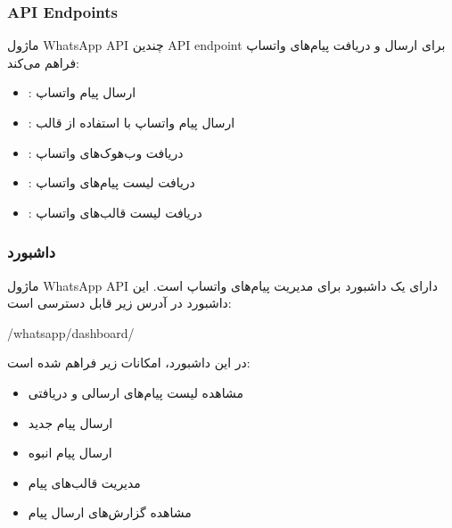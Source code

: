 \documentclass[letterpaper,10pt,english]{sphinxmanual}
\begin{document}
\subsubsection{API Endpoints}
\label{\detokenize{modules/whatsapp_api:api-endpoints}}
\sphinxAtStartPar
ماژول WhatsApp API چندین API endpoint برای ارسال و دریافت پیام‌های واتساپ فراهم می‌کند:
\begin{itemize}
\item {} 
\sphinxAtStartPar
{}: ارسال پیام واتساپ

\item {} 
\sphinxAtStartPar
{}: ارسال پیام واتساپ با استفاده از قالب

\item {} 
\sphinxAtStartPar
{}: دریافت وب‌هوک‌های واتساپ

\item {} 
\sphinxAtStartPar
{}: دریافت لیست پیام‌های واتساپ

\item {} 
\sphinxAtStartPar
{}: دریافت لیست قالب‌های واتساپ

\end{itemize}


\subsubsection{داشبورد}
\label{\detokenize{modules/whatsapp_api:id4}}
\sphinxAtStartPar
ماژول WhatsApp API دارای یک داشبورد برای مدیریت پیام‌های واتساپ است. این داشبورد در آدرس زیر قابل دسترسی است:

\begin{sphinxVerbatim}[commandchars=\\\{\}]
/whatsapp/dashboard/
\end{sphinxVerbatim}

\sphinxAtStartPar
در این داشبورد، امکانات زیر فراهم شده است:
\begin{itemize}
\item {} 
\sphinxAtStartPar
مشاهده لیست پیام‌های ارسالی و دریافتی

\item {} 
\sphinxAtStartPar
ارسال پیام جدید

\item {} 
\sphinxAtStartPar
ارسال پیام انبوه

\item {} 
\sphinxAtStartPar
مدیریت قالب‌های پیام

\item {} 
\sphinxAtStartPar
مشاهده گزارش‌های ارسال پیام

\end{itemize}
\end{document}
